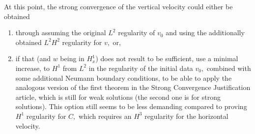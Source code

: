 \documentclass[11pt]{article}
\begin{document}
At this point, the strong convergence of the vertical velocity could either be obtained
\begin{enumerate}
\item through assuming the original $L^2$ regularity of $v_0$ and using the additionally obtained $L^2 H^2$ regularity for $v,$ or,
\item if that (and $w$ being in $H^1_x$)  does not result to be sufficient, use a minimal increase, to $H^1$ from $L^2$ in the regularity of the initial data $v_0,$ combined with some additional Neumann boundary conditions, to be able to apply the analogous version of the first theorem in the Strong Convergence Justification article, which is still for weak solutions (the second one is for strong solutions). This option still seems to be less demanding compared to proving $H^1$ regularity for $C,$ which requires an $H^3$ regularity for the horizontal velocity.
\end{enumerate}
\end{document}
